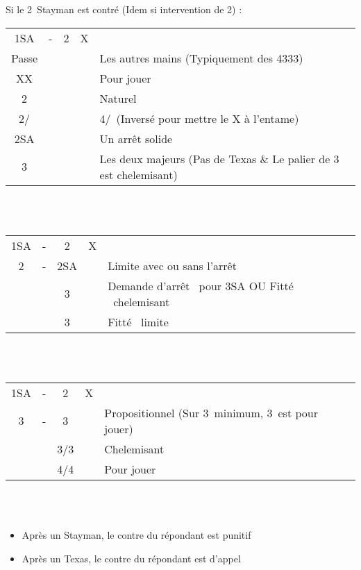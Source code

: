 \documentclass[a4paper, oneside, 11pt]{report}
\begin{document}
		Si le 2\trefle\ Stayman est contré (Idem si intervention de 2\carreau) :\\
		\begin{tabular}{cccc|l}
		1SA & - & 2\trefle & X &\\
		Passe &&&& Les autres mains (Typiquement des 4333)\\
		XX &&&& Pour jouer\\
		2\carreau &&&& Naturel\\
		2\coeur/\pique &&&& 4\pique/\coeur\ (Inversé pour mettre le X à l'entame)\\
		2SA &&&& Un arrêt solide\\
		3\trefle &&&& Les deux majeurs (Pas de Texas \& Le palier de 3 est chelemisant)\\
		\end{tabular}\\\\

		\begin{tabular}{cccc|l}
		1SA & - & 2\trefle & X &\\
		2\pique & - & 2SA && Limite avec ou sans l'arrêt \trefle\\
		&& 3\trefle && Demande d'arrêt \trefle\ pour 3SA OU Fitté \coeur\ chelemisant\\
		&& 3\coeur && Fitté \coeur\ limite\\
		\end{tabular}\\\\
		
		\begin{tabular}{cccc|l}
		1SA & - & 2\trefle & X &\\
		3\trefle & - & 3\carreau && Propositionnel (Sur 3\coeur\ minimum, 3\pique\ est pour jouer)\\
		&& 3\coeur/3\pique && Chelemisant\\
		&& 4\coeur/4\pique && Pour jouer\\
		\end{tabular}\\\\
		
\newpage
		\begin{itemize}
		\item Après un Stayman,  le contre du répondant est punitif
		\item Après un Texas,  le contre du répondant est d'appel\\
		\end{itemize}
\end{document}
